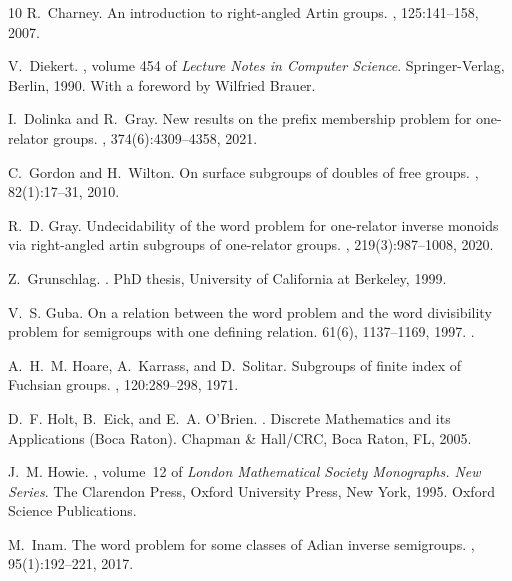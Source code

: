 \documentclass{amsart}
\theoremstyle{plain}
\theoremstyle{definition}
\begin{document}
\begin{thebibliography}{10}
R.~Charney.
\newblock An introduction to right-angled {A}rtin groups.
, 125:141--158, 2007.

V.~Diekert.
, volume 454 of {\em Lecture Notes in
  Computer Science}.
\newblock Springer-Verlag, Berlin, 1990.
\newblock With a foreword by Wilfried Brauer.

I.~Dolinka and R.~Gray.
\newblock New results on the prefix membership problem for one-relator groups.
,
  374(6):4309--4358, 2021.

C.~Gordon and H.~Wilton.
\newblock On surface subgroups of doubles of free groups.
, 82(1):17--31, 2010.

R.~D. Gray.
\newblock Undecidability of the word problem for one-relator inverse monoids
  via right-angled artin subgroups of one-relator groups.
, 219(3):987--1008, 2020.

Z.~Grunschlag.
.
\newblock PhD thesis, University of California at Berkeley, 1999.

V.~S. Guba.
\newblock On a relation between the word problem and the word divisibility
  problem for semigroups with one defining relation.
 61(6), 1137--1169, 1997.
.

A.~H.~M. Hoare, A.~Karrass, and D.~Solitar.
\newblock Subgroups of finite index of {F}uchsian groups.
, 120:289--298, 1971.

D.~F. Holt, B.~Eick, and E.~A. O'Brien.
.
\newblock Discrete Mathematics and its Applications (Boca Raton). Chapman \&
  Hall/CRC, Boca Raton, FL, 2005.

J.~M. Howie.
, volume~12 of {\em London
  Mathematical Society Monographs. New Series}.
\newblock The Clarendon Press, Oxford University Press, New York, 1995.
\newblock Oxford Science Publications.

M.~Inam.
\newblock The word problem for some classes of {A}dian inverse semigroups.
, 95(1):192--221, 2017.


\end{thebibliography}
\end{document}
